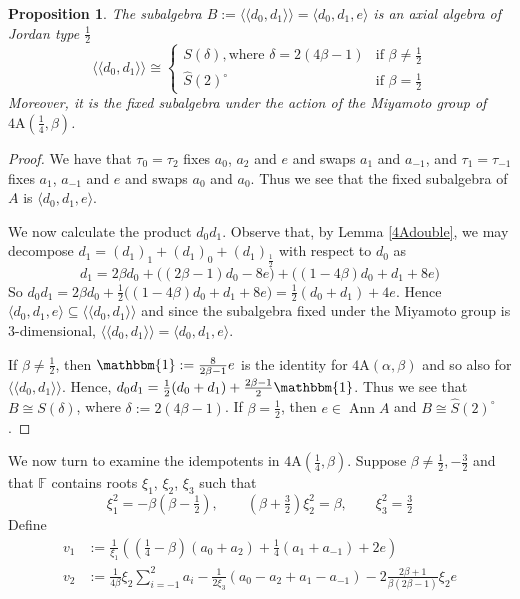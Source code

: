 \documentclass[11pt, a4paper]{article}
\theoremstyle{plain}
\newtheorem{proposition}[theorem]{Proposition}
\theoremstyle{definition}
\newcommand\al{\alpha}
\newcommand\bt{\beta}
\newcommand\la{\langle}
\newcommand\ra{\rangle}
\newcommand\lla{\langle\!\langle}
\newcommand\rra{\rangle\!\rangle}
\DeclareMathOperator{\Ann}{Ann}
\newcommand\FF{\mathbb{F}}
\newcommand{\A}{\mathrm{A}}
\newcommand{\Cl}{\widehat{S}(2)^\circ} %
\newcommand{\0}{\overline{0}}
\newcommand{\2}{\overline{2}}
\newcommand{\1}{\mathbbm{1}}
\newcommand{\rt}{\xi}
\begin{document}
\begin{proposition}\label{4Adoublesub}
The subalgebra $B := \lla d_0, d_1 \rra = \la d_0,d_1,e \ra$ is an axial algebra of Jordan type $\frac{1}{2}$
\[
\lla d_0, d_1 \rra \cong \begin{cases}
S(\delta), \mbox{where } \delta = 2(4\beta-1) & \mbox{if } \bt \neq \frac{1}{2} \\
\Cl & \mbox{if } \bt = \frac{1}{2}
\end{cases}
\]
Moreover, it is the fixed subalgebra under the action of the Miyamoto group of $4\A(\frac{1}{4}, \bt)$.
\end{proposition}
\begin{proof}
We have that $\tau_0 = \tau_2$ fixes $a_0$, $a_2$ and $e$ and swaps $a_1$ and $a_{-1}$, and $\tau_1 = \tau_{-1}$ fixes $a_1$, $a_{-1}$ and $e$ and swaps $a_0$ and $a_0$.  Thus we see that the fixed subalgebra of $A$ is $\la d_0,d_1,e\ra$.

We now calculate the product $d_0d_1$.  Observe that, by Lemma \ref{4Adouble}, we may decompose $d_1 = (d_1)_1 + (d_1)_0 + (d_1)_{\frac{1}{2}}$ with respect to $d_0$ as
\[
d_1 = 2\bt d_0 + \big((2\bt-1)d_0 -8e\big) + \big( (1-4\bt)d_0 + d_1 + 8e \big)
\]
So $d_0d_1 = 2\bt d_0 + \frac{1}{2}\big( (1-4\bt)d_0 + d_1 + 8e \big) = \frac{1}{2}(d_0+d_1) + 4e$.  Hence $\la d_0,d_1,e \ra \subseteq \lla d_0, d_1 \rra$ and since the subalgebra fixed under the Miyamoto group is $3$-dimensional, $\lla d_0,d_1 \rra = \la d_0,d_1,e \ra$.

If $\beta \neq \frac{1}{2}$, then $\1 := \frac{8}{2\bt -1}e$ is the identity for $4\A(\al, \bt)$ and so also for $\lla d_0, d_1 \rra$.  Hence, $d_0d_1 = \frac{1}{2}(d_0+d_1) + \frac{2\bt -1}{2}\1$.  Thus we see that $B \cong S(\delta)$, where $\delta := 2(4\beta-1)$.  If $\bt =\frac{1}{2}$, then $e \in \Ann A$ and $B \cong \Cl$.
\end{proof}




We now turn to examine the idempotents in $4\A(\frac{1}{4}, \bt)$.  Suppose $\bt \neq \frac{1}{2}, -\frac{3}{2}$ and that $\FF$ contains roots $\rt_1$, $\rt_2$, $\rt_3$ such that
\[
\rt_1^2 = -\bt(\bt-\tfrac{1}{2}), \qquad (\bt+ \tfrac{3}{2})\rt_2^2 = \bt, \qquad \rt_3^2 = \tfrac{3}{2}
\]
Define
\begin{align*}
	v_1 &:=  \tfrac{1}{\rt_1}\left ( (\tfrac{1}{4}-\bt)(a_0+a_2) + \tfrac{1}{4}(a_1+a_{-1}) + 2 e \right) \\
	v_2 &:= \tfrac{1}{4\bt}\rt_2 \sum_{i=-1}^2 a_i - \tfrac{1}{2 \rt_3} (a_0- a_2 +a_1 - a_{-1}) - 2\tfrac{2\bt+1}{\bt(2\bt-1)}\rt_2 e
\end{align*}
\end{document}
